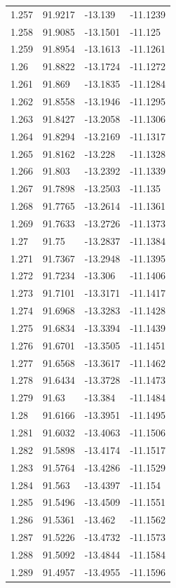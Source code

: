 \begin{tabular}{llll}
1.257 & 91.9217 & -13.139 & -11.1239 \\
1.258 & 91.9085 & -13.1501 & -11.125 \\
1.259 & 91.8954 & -13.1613 & -11.1261 \\
1.26 & 91.8822 & -13.1724 & -11.1272 \\
1.261 & 91.869 & -13.1835 & -11.1284 \\
1.262 & 91.8558 & -13.1946 & -11.1295 \\
1.263 & 91.8427 & -13.2058 & -11.1306 \\
1.264 & 91.8294 & -13.2169 & -11.1317 \\
1.265 & 91.8162 & -13.228 & -11.1328 \\
1.266 & 91.803 & -13.2392 & -11.1339 \\
1.267 & 91.7898 & -13.2503 & -11.135 \\
1.268 & 91.7765 & -13.2614 & -11.1361 \\
1.269 & 91.7633 & -13.2726 & -11.1373 \\
1.27 & 91.75 & -13.2837 & -11.1384 \\
1.271 & 91.7367 & -13.2948 & -11.1395 \\
1.272 & 91.7234 & -13.306 & -11.1406 \\
1.273 & 91.7101 & -13.3171 & -11.1417 \\
1.274 & 91.6968 & -13.3283 & -11.1428 \\
1.275 & 91.6834 & -13.3394 & -11.1439 \\
1.276 & 91.6701 & -13.3505 & -11.1451 \\
1.277 & 91.6568 & -13.3617 & -11.1462 \\
1.278 & 91.6434 & -13.3728 & -11.1473 \\
1.279 & 91.63 & -13.384 & -11.1484 \\
1.28 & 91.6166 & -13.3951 & -11.1495 \\
1.281 & 91.6032 & -13.4063 & -11.1506 \\
1.282 & 91.5898 & -13.4174 & -11.1517 \\
1.283 & 91.5764 & -13.4286 & -11.1529 \\
1.284 & 91.563 & -13.4397 & -11.154 \\
1.285 & 91.5496 & -13.4509 & -11.1551 \\
1.286 & 91.5361 & -13.462 & -11.1562 \\
1.287 & 91.5226 & -13.4732 & -11.1573 \\
1.288 & 91.5092 & -13.4844 & -11.1584 \\
1.289 & 91.4957 & -13.4955 & -11.1596 \\

\end{tabular}
